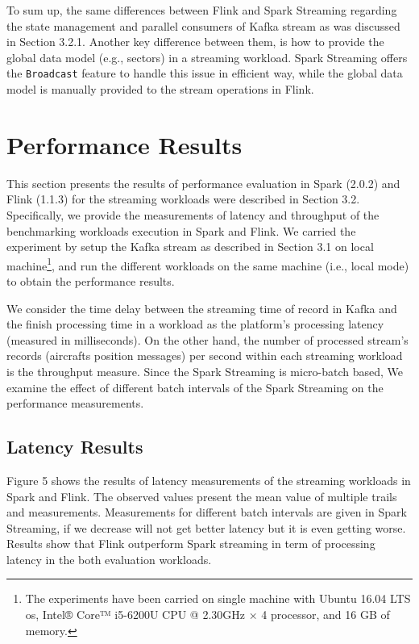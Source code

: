 \documentclass[]{article}
\begin{document}
 
 \par To sum up, the same differences between Flink and Spark Streaming regarding the state management and parallel  consumers of Kafka stream as was discussed in Section 3.2.1. Another key difference between them, is how  to provide the global data model (e.g., sectors) in a streaming workload. Spark Streaming offers the \texttt{Broadcast} feature to handle this issue in efficient way, while the global data model is manually provided  to the stream operations in Flink.
\section{Performance Results}

\par This section presents the results of performance evaluation in Spark (2.0.2) and Flink (1.1.3) for the streaming workloads were described in Section 3.2. Specifically, we provide  the measurements of latency and throughput of the benchmarking workloads execution in Spark and Flink. We carried the experiment by setup the Kafka stream as described in Section 3.1 on local machine\footnote{ The experiments have been carried  on single machine with Ubuntu 16.04 LTS os, Intel® Core™ i5-6200U CPU @ 2.30GHz × 4  processor, and 16 GB of memory.  }, and run the different workloads on the same machine (i.e., local mode) to obtain the performance results.  

\par We consider the time delay between the streaming time of record in Kafka and the 
finish processing time in a workload as the platform's processing latency (measured in milliseconds). On the other hand, the number of processed stream's records (aircrafts position messages) per second within each streaming workload is the throughput measure. Since the Spark Streaming is micro-batch based,  We examine the effect of different batch intervals
of the Spark Streaming on the performance measurements.
\subsection{Latency Results}

Figure 5 shows the results of latency measurements of the streaming workloads in Spark and Flink. The observed values present the mean value of multiple trails and measurements. Measurements for different batch intervals are given in Spark Streaming,  if we decrease  will not get better latency but it is even getting  worse. Results show that Flink outperform Spark streaming in term of processing latency in the both evaluation workloads.
\end{document}

